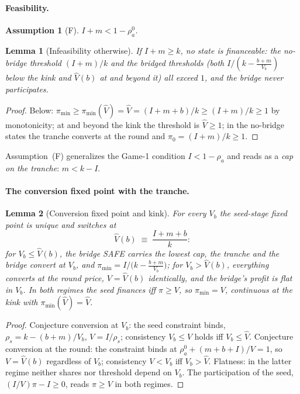 \documentclass[11pt]{article}
\newtheorem{lemma}{Lemma}
\newtheorem{assumption}{Assumption}
\theoremstyle{definition}
\newcommand{\pimin}{\pi_{\min}}
\begin{document}
\paragraph{Feasibility.}

\begin{assumption}[F]\label{ass:F}
$I+m < 1-\rho_a^{0}$.
\end{assumption}

\begin{lemma}[Infeasibility otherwise]\label{lem:infeasible}
If $I+m\ge k$, no state is financeable: the no-bridge threshold $(I+m)/k$ and the bridged thresholds (both $I/(k-\tfrac{b+m}{V_b})$ below the kink and $\hat V(b)$ at and beyond it) all exceed $1$, and the bridge never participates.
\end{lemma}

\begin{proof}
Below: $\pimin\ge\pimin(\hat V)=\hat V=(I+m+b)/k\ge(I+m)/k\ge1$ by monotonicity; at and beyond the kink the threshold is $\hat V\ge1$; in the no-bridge states the tranche converts at the round and $\pi_0=(I+m)/k\ge1$.
\end{proof}

Assumption~(F) generalizes the Game-1 condition $I<1-\rho_a$ and reads as a \emph{cap on the tranche}: $m<k-I$.

\paragraph{The conversion fixed point with the tranche.}

\begin{lemma}[Conversion fixed point and kink]\label{lem:kink}
For every $V_b$ the seed-stage fixed point is unique and switches at
\[
\hat V(b)\;\equiv\;\frac{I+m+b}{k}:
\]
for $V_b\le\hat V(b)$, the bridge SAFE carries the lowest cap, the tranche and the bridge convert at $V_b$, and $\pimin=I\big/\bigl(k-\tfrac{b+m}{V_b}\bigr)$; for $V_b>\hat V(b)$, \emph{everything} converts at the round price, $V=\hat V(b)$ identically, and the bridge's profit is flat in $V_b$. In both regimes the seed finances iff $\pi\ge V$, so $\pimin=V$, continuous at the kink with $\pimin(\hat V)=\hat V$.
\end{lemma}

\begin{proof}
Conjecture conversion at $V_b$: the seed constraint binds, $\rho_s=k-(b+m)/V_b$, $V=I/\rho_s$; consistency $V_b\le V$ holds iff $V_b\le\hat V$. Conjecture conversion at the round: the constraint binds at $\rho_a^{0}+(m+b+I)/V=1$, so $V=\hat V(b)$ regardless of $V_b$; consistency $V<V_b$ iff $V_b>\hat V$. Flatness: in the latter regime neither shares nor threshold depend on $V_b$. The participation of the seed, $(I/V)\pi-I\ge0$, reads $\pi\ge V$ in both regimes.
\end{proof}
\end{document}
